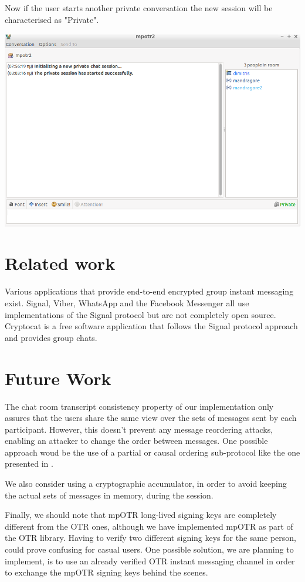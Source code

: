 \documentclass[]{article}
\begin{document}
Now if the user starts another private conversation the new session will be characterised as "Private".

\includegraphics[scale=0.4]{started_verified.png}

\section{Related work}
Various applications that provide end-to-end encrypted group instant messaging exist.
Signal, Viber, \mbox{WhatsApp} and the Facebook Messenger all use implementations of the Signal protocol but are not completely open source.
Cryptocat is a free software application that follows the Signal protocol approach and provides group chats.

\section{Future Work}

The chat room transcript consistency property of our implementation only assures that the users share the same view over the sets of messages sent by each participant.
However, this doesn't prevent any message reordering attacks, enabling an attacker to change the order between messages.
One possible approach woud be the use of a partial or causal ordering sub-protocol like the one presented in \cite{oldblue}.

We also consider using a cryptographic accumulator, in order to avoid keeping the actual sets of messages in memory, during the session.

Finally, we should note that mpOTR long-lived signing keys are completely different from the OTR ones, although we have implemented mpOTR as part of the OTR library.
Having to verify two different signing keys for the same person, could prove confusing for casual users.
One possible solution, we are planning to implement, is to use an already verified OTR instant messaging channel in order to exchange the mpOTR signing keys behind the scenes.



\end{document}
